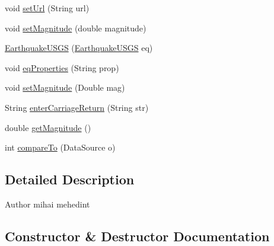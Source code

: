 \begin{DoxyCompactItemize}
void \hyperlink{classbridges_1_1data__src__dependent_1_1_earthquake_u_s_g_s_aaa9d26333e7b80d0f72da58ea2ad41d1}{set\+Url} (String url)
\item 
void \hyperlink{classbridges_1_1data__src__dependent_1_1_earthquake_u_s_g_s_ad7902d80cbbe11046858db1f2792e99d}{set\+Magnitude} (double magnitude)
\item 
\hyperlink{classbridges_1_1data__src__dependent_1_1_earthquake_u_s_g_s_a6b9281a299d6e60736355eb8833f9e0d}{Earthquake\+U\+S\+GS} (\hyperlink{classbridges_1_1data__src__dependent_1_1_earthquake_u_s_g_s}{Earthquake\+U\+S\+GS} eq)
\item 
void \hyperlink{classbridges_1_1data__src__dependent_1_1_earthquake_u_s_g_s_acc0ba6890ee5963f88a399523f009ae4}{eq\+Properties} (String prop)
\item 
void \hyperlink{classbridges_1_1data__src__dependent_1_1_earthquake_u_s_g_s_a34a4c6ebe01c5daa7c86b3a4207d633f}{set\+Magnitude} (Double mag)
\item 
String \hyperlink{classbridges_1_1data__src__dependent_1_1_earthquake_u_s_g_s_aade0ce9a2fee927b015f5eb495c481e1}{enter\+Carriage\+Return} (String str)
\item 
double \hyperlink{classbridges_1_1data__src__dependent_1_1_earthquake_u_s_g_s_a3ec5d753277d6287b222448ff2477291}{get\+Magnitude} ()
\item 
int \hyperlink{classbridges_1_1data__src__dependent_1_1_earthquake_u_s_g_s_a60cad0a286825f77cd2900265acae982}{compare\+To} (Data\+Source o)
\end{DoxyCompactItemize}


\subsection{Detailed Description}
\begin{DoxyAuthor}{Author}
mihai mehedint 
\end{DoxyAuthor}


\subsection{Constructor \& Destructor Documentation}
\hypertarget{classbridges_1_1data__src__dependent_1_1_earthquake_u_s_g_s_a681da199afeab00ae170416841f235e2}{}\label{classbridges_1_1data__src__dependent_1_1_earthquake_u_s_g_s_a681da199afeab00ae170416841f235e2} 
